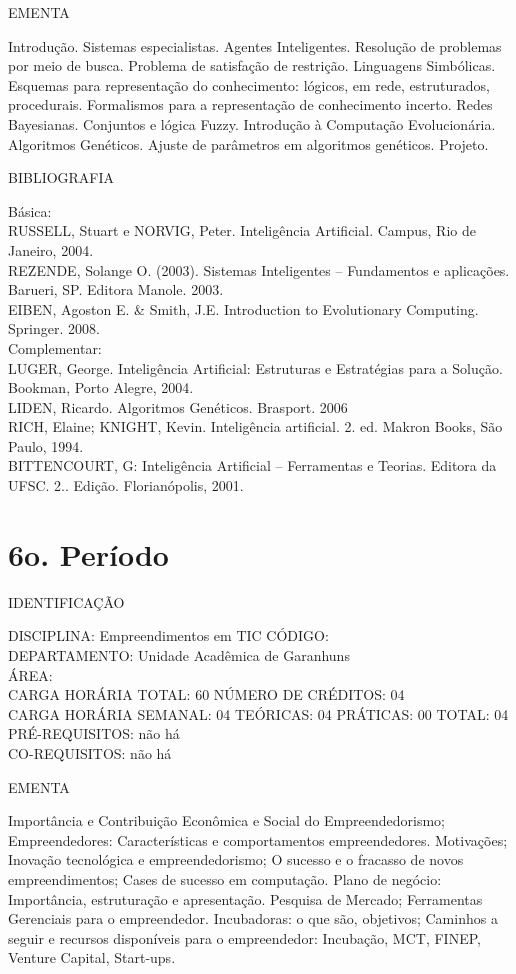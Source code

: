 \documentclass[
	12pt,				%
	openright,			%
  oneside,     %
	a4paper,			%
	english,			%
	french,				%
	spanish,			%
	brazil				%
	]{abntex2}
\begin{document}
\begin{apendicesenv}
EMENTA 

Introdução. Sistemas especialistas. Agentes Inteligentes. Resolução de
problemas por meio de busca. Problema de satisfação de restrição.
Linguagens Simbólicas. Esquemas para representação do conhecimento:
lógicos, em rede, estruturados, procedurais. Formalismos para a
representação de conhecimento incerto. Redes Bayesianas. Conjuntos e
lógica Fuzzy. Introdução à Computação Evolucionária. Algoritmos
Genéticos. Ajuste de parâmetros em algoritmos genéticos. Projeto.

BIBLIOGRAFIA 

Básica:\\
RUSSELL, Stuart e NORVIG, Peter. Inteligência Artificial. Campus, Rio de
Janeiro, 2004.\\
REZENDE, Solange O. (2003). Sistemas Inteligentes -- Fundamentos e
aplicações. Barueri, SP. Editora Manole. 2003.\\
EIBEN, Agoston E. \& Smith, J.E. Introduction to Evolutionary Computing.
Springer. 2008.\\
Complementar:\\
LUGER, George. Inteligência Artificial: Estruturas e Estratégias para a
Solução. Bookman, Porto Alegre, 2004.\\
LIDEN, Ricardo. Algoritmos Genéticos. Brasport. 2006\\
RICH, Elaine; KNIGHT, Kevin. Inteligência artificial. 2. ed. Makron
Books, São Paulo, 1994.\\
BITTENCOURT, G: Inteligência Artificial -- Ferramentas e Teorias.
Editora da UFSC. 2.. Edição. Florianópolis, 2001.
\newpage 

\section*{6o. Período}

IDENTIFICAÇÃO

DISCIPLINA: Empreendimentos em TIC CÓDIGO:\\ 
DEPARTAMENTO: Unidade Acadêmica de Garanhuns\\
ÁREA:\\
CARGA HORÁRIA TOTAL: 60 NÚMERO DE CRÉDITOS: 04\\
CARGA HORÁRIA SEMANAL: 04 TEÓRICAS: 04 PRÁTICAS: 00 TOTAL: 04\\
PRÉ-REQUISITOS: não há\\
CO-REQUISITOS: não há

EMENTA 

Importância e Contribuição Econômica e Social do Empreendedorismo;
Empreendedores: Características e comportamentos empreendedores.
Motivações; Inovação tecnológica e empreendedorismo; O sucesso e o
fracasso de novos empreendimentos; Cases de sucesso em computação.
Plano de negócio: Importância, estruturação e apresentação. Pesquisa de
Mercado; Ferramentas Gerenciais para o empreendedor. Incubadoras: o que
são, objetivos; Caminhos a seguir e recursos disponíveis para o
empreendedor: Incubação, MCT, FINEP, Venture Capital, Start-ups.


\end{apendicesenv}
\end{document}
